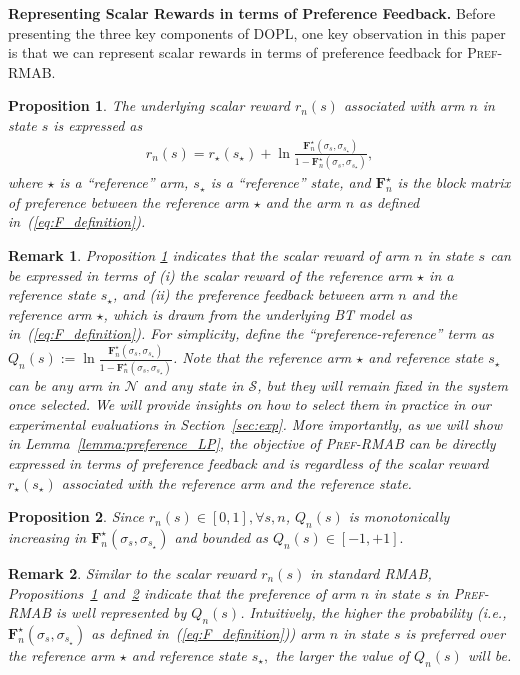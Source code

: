 \documentclass{article} %
\def\eqref#1{equation~\ref{#1}}
\newcommand{\RMABPF}{\textsc{Pref-RMAB}\xspace}
\newcommand{\DOPL}{\textsc{DOPL}\xspace}
\newcommand{\I}{\sigma}
\newcommand{\bF}{\mathbf{F}}
\newcommand{\cS}{\mathcal{S}}
\newcommand{\cN}{\mathcal{N}}
\newtheorem{remark}{Remark}
\renewcommand{\eqref}[1]{(\ref{#1})}
\newtheorem{prop}{Proposition}
\begin{document}
\textbf{Representing Scalar Rewards in terms of Preference Feedback.} Before presenting the three key components of \DOPL, one key observation in this paper is that we can represent scalar rewards in terms of preference feedback for \RMABPF. 
{\begin{prop}\label{lemma:Reward_reference}
The underlying scalar reward $r_n(s)$ associated with arm $n$ in state $s$ is expressed as
\begin{align*}
    r_n(s)=r_\star(s_\star)+\ln\frac{\bF_n^\star(\I_s, \I_{s_\star})}{1-\bF_n^\star(\I_s, \I_{s_\star})},
\end{align*}
where $\star$ is a ``reference'' arm, $s_\star$ is a ``reference'' state, and $\bF_n^\star$ is the block matrix of preference between the reference arm $\star$ and the arm $n$ as defined in~\eqref{eq:F_definition}. 
\end{prop}
\begin{remark}
Proposition \ref{lemma:Reward_reference} indicates that the scalar reward of arm $n$ in state $s$ can be expressed in terms of (i) the scalar reward of the reference arm $\star$ in a reference state $s_\star$, and (ii) the preference feedback between arm $n$ and the reference arm $\star$, which is drawn from the underlying BT model as in~(\ref{eq:F_definition}). For simplicity, define the ``preference-reference'' term as $Q_n(s):=\ln\frac{\bF_n^\star(\I_s, \I_{s_\star})}{1-\bF_n^\star(\I_s, \I_{s_\star})}$. Note that the reference arm $\star$ and reference state $s_\star$ can be any arm in $\cN$ and any state in $\cS$, but they will remain fixed in the system once selected. We will provide insights on how to select them in practice in our experimental evaluations in Section~\ref{sec:exp}. More importantly, as we will show in Lemma~\ref{lemma:preference_LP}, the objective of %
\RMABPF can be directly expressed in terms of preference feedback and is regardless of the scalar reward $r_\star(s_\star)$ associated with the reference arm and the reference state. 
\end{remark}

 

\begin{prop}\label{lemma:bounded_Q}
Since $r_n(s)\in[0,1], \forall s, n$, $Q_n(s)$ is monotonically increasing in $\bF_n^\star(\I_s, \I_{s_\star})$ and bounded as $Q_n(s)\in[-1, +1].$ 
\end{prop}
\begin{remark}
    Similar to the scalar reward $r_n(s)$ in standard RMAB, Propositions~\ref{lemma:Reward_reference} and~\ref{lemma:bounded_Q} indicate that the preference of arm $n$ in state $s$ in \RMABPF is well represented by $Q_n(s)$. 
    Intuitively, the higher the probability (i.e., $\bF_n^\star(\I_s, \I_{s_\star})$ as defined in~\eqref{eq:F_definition}) arm $n$ in state $s$ is preferred over the reference arm $\star$ and reference state $s_{\star},$ the larger the value of $Q_n(s)$ will be.
\end{remark}
}
\end{document}
